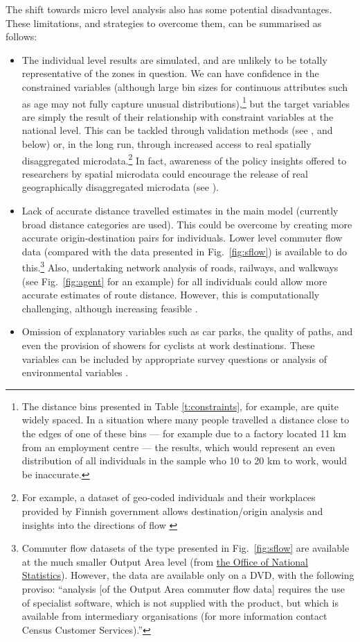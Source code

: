 \documentclass[a4paper, 11pt, twoside]{Thesis}
\begin{document}
The shift towards micro level analysis also has some potential
disadvantages. These limitations,
and strategies to overcome them, can be summarised as follows:
\begin{itemize}
 \item The individual level results are simulated, and are unlikely to be
 totally representative of the zones in question. We can have confidence
 in the constrained variables (although large bin sizes for continuous
 attributes such as age may not fully capture unusual
 distributions),\footnote{The
 distance bins presented in Table \ref{t:constraints}, for example,
 are quite widely spaced. In a situation where many people
 travelled a distance close to the edges of one of these bins --- for example
 due to a factory located 11 km from an employment centre --- the results,
 which would represent an even distribution of
 all individuals in the sample who 10 to 20 km to work, would
 be inaccurate.}
 but the target variables are simply the result of their relationship with
 constraint variables at the national level. This can be tackled through
 validation methods (see \citealp{Edwards2009}, and
 below) or, in the long run, through increased access to real spatially
 disaggregated
 microdata.\footnote{For example, a dataset of geo-coded
individuals and their workplaces provided by Finnish government allows
destination/origin analysis and insights into the directions of flow
\citep{Helminen2007}
}
In fact, awareness of the policy insights offered to researchers
by spatial microdata could encourage the release of real
geographically disaggregated microdata (see \citep{Lee2009}).
\item Lack of accurate distance travelled estimates in the main model
(currently broad distance categories are used). This could be overcome by creating
more accurate origin-destination pairs for individuals. Lower level commuter
flow data (compared with the data presented in Fig.~\ref{fig:sflow}) is
available to do this.\footnote{Commuter flow
datasets of the type presented in Fig.~\ref{fig:sflow} are available at the much
smaller Output Area level
(from
\href{http://www.ons.gov.uk/ons/guide-method/census/census-2001/data-and-products/data-and-product-catalogue/origin---destination-statistics/output-areas/index.html}
{the Office of National Statistics}). However, the data are available only on a DVD, with the following proviso:
``analysis [of the Output Area commuter flow data] requires the use of
specialist software, which is not supplied with the product, but which is
available from intermediary organisations (for more information contact Census
Customer Services).''
}
Also, undertaking network analysis of roads, railways, and walkways (see
Fig.~\ref{fig:agent} for an example) for all individuals could allow more
accurate estimates of route distance. However, this is computationally
challenging, although increasing feasible \citep{gao2010comparison}.
\item Omission of explanatory variables such as car parks, the quality of paths,
and even the provision of showers for cyclists at work destinations. These
variables can be included by appropriate survey questions \citep{Buehler2012}
or analysis of environmental variables \citep{Rietveld2004}.
\end{itemize}
\end{document}
